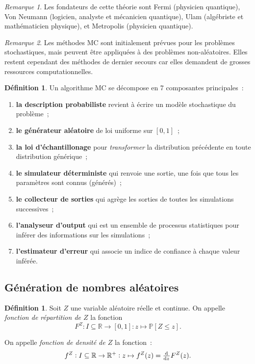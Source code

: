 \documentclass{article}
\theoremstyle{definition}
\newtheorem{déf}[thm]{Définition}
\theoremstyle{remark}
\newtheorem*{rmq}{Remarque}
\renewcommand{\P}{\mathbb P}
\newcommand{\R}{\mathbb R}
\begin{document}
	\begin{rmq} Les fondateurs de cette théorie sont Fermi (physicien quantique), Von Neumann (logicien, analyste et mécanicien quantique), Ulam (algébriste et
	mathématicien physique), et Metropolis (physicien quantique).
	\end{rmq}

	\begin{rmq} Les méthodes MC sont initialement prévues pour les problèmes stochastiques, mais peuvent être appliquées à des problèmes non-aléatoires. Elles
	restent cependant des méthodes de dernier secours car elles demandent de grosses ressources computationnelles.
	\end{rmq}

	\begin{déf} Un algorithme MC se décompose en 7 composantes principales~:
	\begin{enumerate}
		\item \textbf{la description probabiliste} revient à écrire un modèle stochastique du problème~;
		\item \textbf{le générateur aléatoire} de loi uniforme sur $[0, 1]$~;
		\item \textbf{la loi d'échantillonage} pour \textit{transformer} la distribution précédente en toute distribution générique~;
		\item \textbf{le simulateur déterministe} qui renvoie une sortie, une fois que tous les paramètres sont connus (générés)~;
		\item \textbf{le collecteur de sorties} qui agrège les sorties de toutes les simulations successives~;
		\item \textbf{l'analyseur d'output} qui est un ensemble de processus statistiques pour inférer des informations sur les simulations~;
		\item \textbf{l'estimateur d'erreur} qui associe un indice de confiance à chaque valeur inférée.
	\end{enumerate}
	\end{déf}

	\subsection{Génération de nombres aléatoires}

	\begin{déf} Soit $Z$ une variable aléatoire réelle et continue. On appelle \textit{fonction de répartition de $Z$} la fonction
	\[F^Z : I \subseteq \R \to [0, 1] : z \mapsto \P[Z \leq z].\]

	On appelle \textit{fonction de densité de $Z$} la fonction~:
	\[f^Z : I \subseteq \R \to \R^+ : z \mapsto f^Z(z) = \od {}zF^Z(z).\]
	\end{déf}
\end{document}
